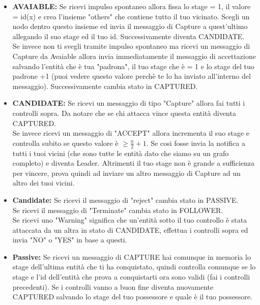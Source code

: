 \begin{itemize}
    \item \textbf{AVAIABLE:} Se ricevi impulso spontaneo allora fissa lo stage =
          1, il valore = id(x) e crea l'insieme "others" che contiene tutto il tuo
          vicinato. Scegli un nodo dentro questo insieme ed invia il messaggio di
          Capture a quest'ultimo allegando il suo stage ed il tuo id. Successivamente
          diventa CANDIDATE.\\
          Se invece non ti svegli tramite impulso spontaneo ma ricevi un messaggio
          di Capture da Avaiable allora invia immediatamente il messaggio di
          accettazione salvando l'entità che è tua "padrona", il tuo stage che è =
          1 e lo stage del tuo padrone +1 (puoi vedere questo valore perchè te lo
          ha inviato all'interno del messaggio). Successivamente cambia stato in
          CAPTURED.
    \item \textbf{CANDIDATE:} Se ricevi un messaggio di tipo "Capture" allora fai
          tutti i controlli sopra. Da notare che se chi attacca vince questa entità
          diventa CAPTURED.\\
          Se invece ricevi un messaggio di "ACCEPT" allora incrementa il suo stage
          e controlla subito se questo valore è $\geq \frac{n}{2} +1$. Se cosi
          fosse invia la notifica a tutti i tuoi vicini (che sono tutte le entità
          dato che siamo su un grafo completo) e diventa Leader. Altrimenti il tuo
          stage non è grande a sufficienza per vincere, prova quindi ad inviare un
          altro messaggio di Capture ad un altro dei tuoi vicini.
    \item \textbf{Candidate:} Se ricevi il messaggio di "reject" cambia stato in
          PASSIVE. \\ Se ricevi il messaggio di "Terminate" cambia stato in
          FOLLOWER. \\ Se ricevi uno "Warning" significa che un'entità sotto il
          tuo controllo è stata attaccata da un altra in stato di CANDIDATE,
          effettua i controlli sopra ed invia "NO" o "YES" in base a questi.
    \item \textbf{Passive:} Se ricevi un messaggio di CAPTURE hai comunque in
          memoria lo stage dell'ultima entità che ti ha conquistato, quindi controlla
          comunque se lo stage e l'id dell'entità che prova a conquistarti ora sono
          validi (fai i controlli precedenti). Se i controlli vanno a buon fine diventa
          nuovamente CAPTURED salvando lo stage del tuo possessore e quale è il tuo
          possessore.
\end{itemize}

